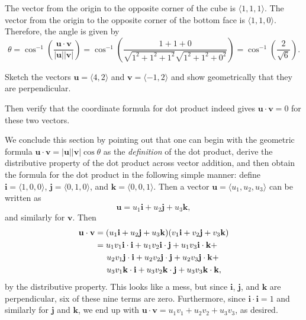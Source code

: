 \documentclass[svgnames]{watsonbook}
\begin{document}
\begin{solution} 
  The vector from the origin to the opposite corner of the cube is $\langle
  1,1,1\rangle$. The vector from the origin to the opposite corner of
  the bottom face is $\langle 1,1,0 \rangle$. Therefore, the angle is given by 
  \[
    \theta = \cos^{-1}\left(\frac{\mathbf{u} \cdot
        \mathbf{v}}{|\mathbf{u}||\mathbf{v}|}\right) = \cos^{-1}\left(
      \frac{1 + 1 + 0}{\sqrt{1^2 + 1^2 + 1^2}\sqrt{1^2+1^2+0^2}}
    \right) = \boxed{\cos^{-1}\left(\frac{2}{\sqrt{6}}\right)}. 
  \]
\end{solution}

\begin{exercise}{}{}
  Sketch the vectors $\mathbf{u} = \langle 4,2 \rangle$ and
  $\mathbf{v} = \langle -1, 2\rangle$ and show geometrically that they
  are perpendicular. 

  Then verify that the coordinate formula for dot product indeed gives 
  $\mathbf{u} \cdot \mathbf{v} = 0$ for these two vectors. 
\end{exercise}

We conclude this section by pointing out that one can begin with the
geometric formula
$\mathbf{u} \cdot \mathbf{v} = |\mathbf{u}| |\mathbf{v}| \cos\theta$
as the \textit{definition} of the dot product, derive the distributive
property of the dot product across vector addition, and then obtain
the formula for the dot product in the following simple manner: define
$\mathbf{i} = \langle1,0,0\rangle$,
$\mathbf{j} = \langle0,1,0\rangle$, and
$\mathbf{k} = \langle0,0,1\rangle$. Then a vector
$\mathbf{u} = \langle u_1, u_2, u_3\rangle$ can be written as
\[
\mathbf{u} = u_1 \mathbf{i} + u_2 \mathbf{j} + u_3 \mathbf{k},
\]
and similarly for $\mathbf{v}$. Then 
\begin{align*}
  \mathbf{u} \cdot \mathbf{v} &= (u_1 \mathbf{i} + u_2 \mathbf{j} + u_3
  \mathbf{k})(v_1 \mathbf{i} + v_2 \mathbf{j} + v_3 \mathbf{k})  \\
  &= u_1 v_1 \mathbf{i} \cdot \mathbf{i} + u_1 v_2 \mathbf{i} \cdot
    \mathbf{j}  + u_1 v_3 \mathbf{i} \cdot \mathbf{k}  + \\ 
  &\hspace{5mm}  u_2 v_1 \mathbf{j} \cdot \mathbf{i} + u_2 v_2 \mathbf{j} \cdot
    \mathbf{j}  + u_2 v_3 \mathbf{j} \cdot \mathbf{k}  + \\ 
  &\hspace{5mm}  u_3 v_1 \mathbf{k} \cdot \mathbf{i} + u_3 v_2 \mathbf{k} \cdot
    \mathbf{j}  + u_3 v_3 \mathbf{k} \cdot \mathbf{k},
\end{align*}
by the distributive property. This looks like a mess, but since
$\mathbf{i}$,  $\mathbf{j}$, and  $\mathbf{k}$ are 
perpendicular, six of these nine terms are zero. Furthermore, since
$\mathbf{i}\cdot \mathbf{i} = 1$ and similarly for $\mathbf{j}$ and
$\mathbf{k}$, we end up with $  \mathbf{u} \cdot \mathbf{v}  = u_1 v_1
+ u_2 v_2 + u_3 v_3$, as desired. 
\end{document}

